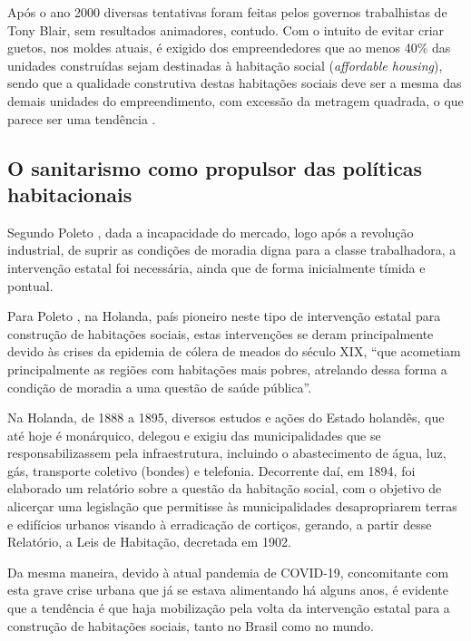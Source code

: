 \documentclass[
	12pt,				%
	oneside,			%
	a4paper,			%
	chapter=TITLE,		%
	section=TITLE,		%
	english,			%
	brazil				%
	]{abntex2}
\begin{document}
\begin{refsection}
Após o ano 2000 diversas tentativas foram feitas pelos governos trabalhistas de
Tony Blair, sem resultados animadores, contudo. Com o intuito de evitar criar
guetos, nos moldes atuais, é exigido dos empreendedores que ao menos 40\% das
unidades construídas sejam destinadas à habitação social (\emph{affordable housing}),
sendo que a qualidade construtiva destas habitações sociais deve ser a mesma das
demais unidades do empreendimento, com excessão da metragem quadrada, o que
parece ser uma tendência \autocite[77]{jung2018}.

\hypertarget{o-sanitarismo-como-propulsor-das-poluxedticas-habitacionais}{%
\subsection{O sanitarismo como propulsor das políticas habitacionais}\label{o-sanitarismo-como-propulsor-das-poluxedticas-habitacionais}}

Segundo Poleto \autocite*[36]{poleto}, dada a incapacidade do mercado, logo após a
revolução industrial, de suprir as condições de moradia digna para a classe
trabalhadora, a intervenção estatal foi necessária, ainda que de forma
inicialmente tímida e pontual.

Para Poleto \autocite*[37]{poleto}, na Holanda, país pioneiro neste tipo de intervenção
estatal para construção de habitações sociais, estas intervenções se deram
principalmente devido às crises da epidemia de cólera de meados do século XIX,
``que acometiam principalmente as regiões com habitações mais pobres, atrelando
dessa forma a condição de moradia a uma questão de saúde pública''.
\begin{citacao}
Na Holanda, de 1888 a 1895, diversos estudos e ações do Estado holandês, que até
hoje é monárquico, delegou e exigiu das municipalidades que se
responsabilizassem pela infraestrutura, incluindo o abastecimento de água, luz,
gás, transporte coletivo (bondes) e telefonia.
Decorrente daí, em 1894, foi elaborado um relatório sobre a questão da habitação
social, com o objetivo de alicerçar uma legislação que permitisse às
municipalidades desapropriarem terras e edifícios urbanos visando à erradicação
de cortiços, gerando, a partir desse Relatório, a Leis de Habitação, decretada
em 1902.
\cite[p.~317]{poleto}
\end{citacao}
Da mesma maneira, devido à atual pandemia de COVID-19, concomitante com esta
grave crise urbana que já se estava alimentando há alguns anos, é evidente que
a tendência é que haja mobilização pela volta da intervenção estatal para a
construção de habitações sociais, tanto no Brasil como no mundo.


\end{refsection}
\end{document}
